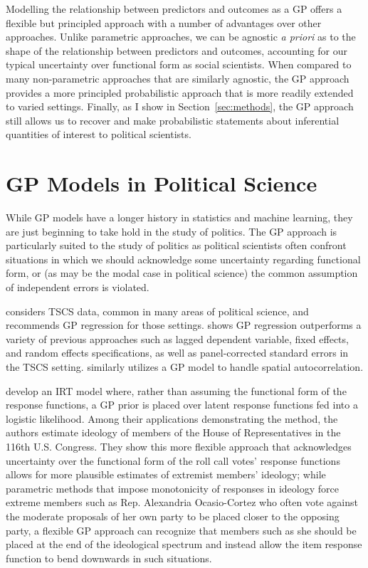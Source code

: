\documentclass{draft}
\begin{document}
Modelling the relationship between predictors and outcomes as a GP offers
a flexible but principled approach with a number of advantages over other approaches.
Unlike parametric approaches, we can be agnostic \emph{a priori} as to the shape of the relationship between predictors and outcomes,
accounting for our typical uncertainty over functional form as social scientists.
When compared to many non-parametric approaches that are similarly agnostic,
the GP approach provides a more principled probabilistic approach that is more readily extended to varied settings.
Finally, as I show in Section~\ref{sec:methods}, the GP approach
still allows us to recover and make probabilistic statements about inferential quantities of interest to political scientists.


\section{GP Models in Political Science}
\label{sec:lit-review}

While GP models have a longer history in statistics and machine learning, they are just beginning to take hold in the study of politics.
The GP approach is particularly suited to the study of politics as political scientists often confront situations in which
we should acknowledge some uncertainty regarding functional form,
or (as may be the modal case in political science) the common assumption of independent errors is violated.

\citet{Carlson2020Modeling} considers TSCS data, common in many areas of political science,
and recommends GP regression for those settings.
\citet{Carlson2020Modeling} shows GP regression outperforms a variety of previous approaches
such as lagged dependent variable, fixed effects, and random effects specifications,
as well as panel-corrected standard errors in the TSCS setting.
\citet{Gill2020Measuring} similarly utilizes a GP model to handle spatial autocorrelation.

\citet{Duck-MayrEtAl2020GPIRT} develop an IRT model where,
rather than assuming the functional form of the response functions,
a GP prior is placed over latent response functions fed into a logistic likelihood.
Among their applications demonstrating the method,
the authors estimate ideology of members of the House of Representatives in the 116th U.S. Congress.
They show this more flexible approach that acknowledges uncertainty over the functional form of the roll call votes' response functions
allows for more plausible estimates of extremist members' ideology;
while parametric methods that impose monotonicity of responses in ideology force extreme members such as
Rep. Alexandria Ocasio-Cortez who often vote against the moderate proposals of her own party to be placed closer to the opposing party,
a flexible GP approach can recognize that members such as she should be placed at the end of the ideological spectrum and instead
allow the item response function to bend downwards in such situations.
\end{document}
